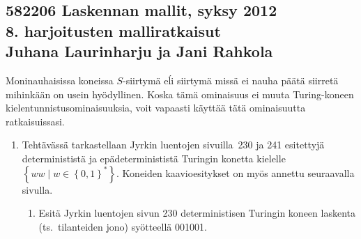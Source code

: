 \documentclass[finnish,11pt,draft]{article}
\newcommand{\set}[1]{{\left\{ #1 \right\}}}
\begin{document}
\subsection*{582206 Laskennan mallit, syksy 2012 \\
  \textmd{8. harjoitusten malliratkaisut \\
    Juhana Laurinharju ja Jani Rahkola}}

Moninauhaisissa koneissa $S$-siirtymä eĺi siirtymä missä ei nauha päätä
siirretä mihinkään on usein hyö\-dyl\-li\-nen. Koska tämä ominaisuus ei muuta
Turing-koneen kielentunnistusominaisuuksia, voit vapaasti käyttää tätä
ominaisuutta ratkaisuissasi.

\begin{enumerate}
\item
  Tehtävässä tarkastellaan Jyrkin luentojen sivuilla~230 ja 241 esitettyjä
  determinististä ja e\-pä\-de\-ter\-mi\-nis\-tis\-tä Turingin konetta
  kielelle $\set{ww\mid w\in\set{0,1}^\ast}$. Koneiden kaavioesitykset on myös
  annettu seuraavalla sivulla.
  \begin{enumerate}
  \item
    Esitä Jyrkin luentojen sivun 230 deterministisen Turingin koneen laskenta
    (ts.\ tilanteiden jono) syötteellä 001001.


\end{enumerate}
\end{enumerate}
\end{document}
